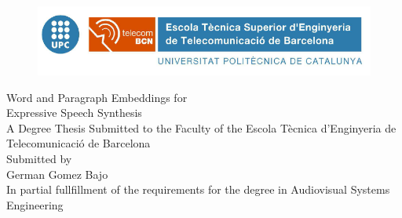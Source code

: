 \documentclass[11pt,a4paper]{report}
\author{German Gomez Bajo}
\begin{document}
\begin{titlepage}

	\begin{center}
		\begin{figure}[htb]
		\centering
			\includegraphics[width=1\textwidth]{figures/logo_upc.png}
		\end{figure}

		\vspace{1cm}


                 \Huge Word and Paragraph Embeddings for \\ \vspace{0.3cm} Expressive Speech Synthesis \\ 

		\vspace*{0.3in}
		\vspace*{0.1in}
		{\Large A Degree Thesis Submitted to the Faculty of the Escola Tècnica d'Enginyeria de Telecomunicació de Barcelona \\ Submitted by}\\
		\vspace{2cm}
		{\Large German Gomez Bajo}\\
		\vspace{2cm}
		{\Large In partial fullfillment of the requirements for the degree in Audiovisual Systems Engineering }\\
		\vspace{1cm}
		\begin{tabular}{ll}


\end{tabular}
\end{center}
\end{titlepage}
\end{document}
